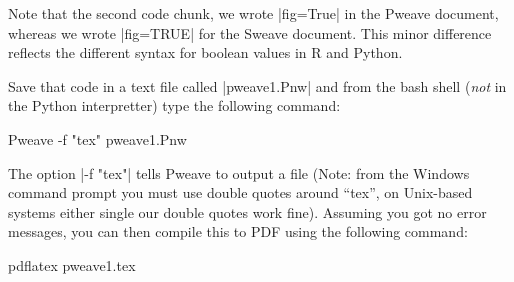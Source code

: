 %
Note that the second code chunk, we wrote |fig=True| in the
Pweave document, whereas we wrote |fig=TRUE| for the Sweave
document. This minor difference reflects the different syntax for
boolean values in R and Python.

Save that code in a text file called |pweave1.Pnw| and from
the bash shell (\emph{not} in the Python interpretter) type the
following command:
%
\begin{bash}
Pweave -f "tex" pweave1.Pnw
\end{bash}
%
The option |-f "tex"| tells Pweave to output a file (Note:
from the Windows command prompt you must use double quotes around
``tex'', on Unix-based systems either single our double quotes work
fine). Assuming you got no error messages, you can then compile this to
PDF using the following command:
%
\begin{bash}
pdflatex pweave1.tex
\end{bash}
